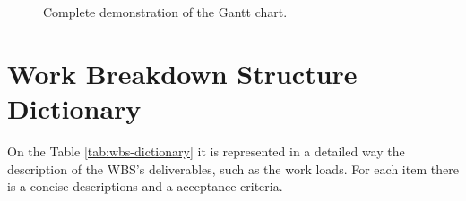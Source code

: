 \begin{figure}
    \centering
    \caption{Complete demonstration of the Gantt chart.}
    \label{fig:gantt_complete}
\end{figure}

\section{Work Breakdown Structure Dictionary}

On the Table \ref{tab:wbs-dictionary} it is represented in a detailed way the description of the \gls{WBS}'s deliverables, such as the work loads. For each item there is a concise descriptions and a acceptance criteria.

